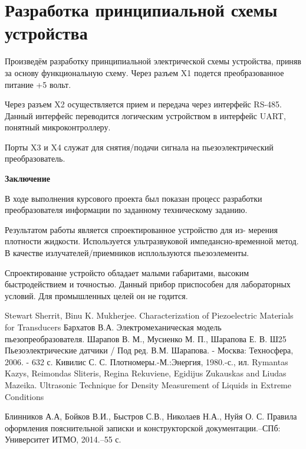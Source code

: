 \documentclass[russian, utf8, 12pt]{eskdtext}
\newcommand*{\StructSection}[1]{\centerline{\Large \bfseries #1}\vspace{21pt}}
\begin{document}
\newpage
\section{Разработка принципиальной схемы устройства}
Произведём разработку принципиальной электрической схемы устройства, приняв за основу функциональную схему. Через разъем X1 подется преобразованное питание +5 вольт. \par
Через разъем X2 осуществляется прием и передача через интерфейс RS-485. Данный интерфейс переводится логическим устройством в интерфейс UART, понятный микроконтроллеру. \par
Порты X3 и X4 служат для снятия/подачи сигнала на пьезоэлектрический преобразователь. 

\newpage
{\StructSection{Заключение}
}

В ходе выполнения курсового проекта был показан процесс разработки преобразователя информации по заданному техническому заданию. \par
Результатом работы является спроектированное устройство для из-
мерения плотности жидкости. Используется ультразвуковой импедансно-временной метод. В качестве излучателей/приемников исплользуются пьезоэлементы. \par
Спроектированне устройсто обладает малыми габаритами, высоким быстродействием и точностью. Данный прибор приспособен для лабораторных условий. Для промышленных целей он не годится. 

\newpage
%
\renewcommand\refname{Список использованных источников} %

\begin{thebibliography}{}
	 Stewart Sherrit, Binu K. Mukherjee. Characterization of Piezoelectric Materials for Transducers
	 Бархатов В.А. Электромеханическая модель пьезопреобразователя.
	 Шарапов В. М., Мусиенко М. П., Шарапова Е. В. Ш25 Пьезоэлектрические датчики / Под ред. В.М. Шарапова. - Москва: Техносфера, 2006. - 632 с.
	 Кивилис С. С. Плотномеры.-М.:Энергия, 1980.-с., ил.
	 Rymantas Kazys, Reimondas Sliteris, Regina Rekuviene, Egidijus Zukauskas and Liudas Mazeika. Ultrasonic Technique for Density Measurement of Liquids in Extreme Conditions

      Блинников А.А, Бойков В.И., Быстров С.В., Николаев Н.А., Нуйя О. С. Правила оформления пояснительной записки и конструкторской документации.–СПб: Университет ИТМО, 2014.–55 с.
\end{thebibliography}
\end{document}
